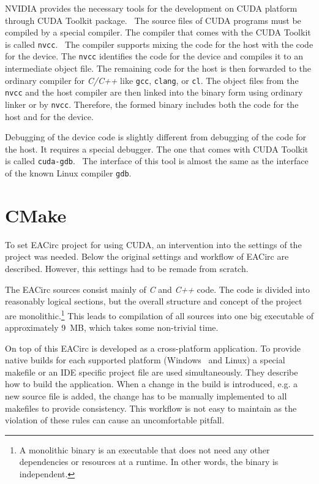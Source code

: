 \documentclass[12pt,oneside]{fithesis2}
\begin{document}
NVIDIA provides the necessary tools for the development on CUDA platform through CUDA Toolkit package.~\cite{cuda_toolkit} The source files of CUDA programs must be compiled by a special compiler. The compiler that comes with the CUDA Toolkit is called \texttt{nvcc}.~\cite{cuda_compiler} The compiler supports mixing the code for the host with the code for the device. The \texttt{nvcc} identifies the code for the device and compiles it to an intermediate object file. The remaining code for the host is then forwarded to the ordinary compiler for \emph{C/C++} like \texttt{gcc}, \texttt{clang}, or \texttt{cl}. The object files from the \texttt{nvcc} and the host compiler are then linked into the binary form using ordinary linker or by \texttt{nvcc}. Therefore, the formed binary includes both the code for the host and for the device.

Debugging of the device code is slightly different from debugging of the code for the host. It requires a special debugger. The one that comes with CUDA Toolkit is called \texttt{cuda-gdb}.~\cite{cuda_gdb} The interface of this tool is almost the same as the interface of the known Linux compiler \texttt{gdb}.






\chapter{CMake}

To set EACirc project for using CUDA, an intervention into the settings of the project was needed. Below the original settings and workflow of EACirc are described. However, this settings had to be remade from scratch.

The EACirc sources consist mainly of \emph{C} and \emph{C++} code. The code is divided into reasonably logical sections, but the overall structure and concept of the project are monolithic.\footnote{A monolithic binary is an executable that does not need any other dependencies or resources at a runtime. In other words, the binary is independent.} This leads to compilation of all sources into one big executable of approximately 9~MB, which takes some non-trivial time.

On top of this EACirc is developed as a cross-platform application. To provide native builds for each supported platform (Windows~\cite{win} and Linux) a special makefile or an IDE specific project file are used simultaneously. They describe how to build the application. When a change in the build is introduced, e.g. a new source file is added, the change has to be manually implemented to all makefiles to provide consistency. This workflow is not easy to maintain as the violation of these rules can cause an uncomfortable pitfall.
\end{document}
